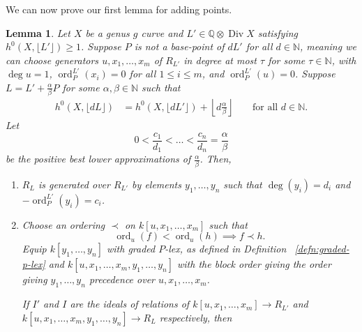 \documentclass{amsart}
\theoremstyle{plain}
\newtheorem{lem}[thm]{Lemma}
\theoremstyle{definition}
\theoremstyle{remark}
\numberwithin{equation}{section}
\newcommand\BN{{\mathbb N}}
\newcommand\BQ{{\mathbb Q}}
\DeclareMathOperator{\ord}{ord}
\DeclareMathOperator\di{Div}
\newcommand{\halfcan}{L}
\begin{document}
We can now prove our first lemma for adding points.

\begin{lem}
\label{lem:sat-1}
Let $X$ be a genus $g$ curve and $\halfcan' \in \BQ \otimes \di X$
satisfying $h^0(X, \lfloor{\halfcan'}\rfloor)\ge 1$. Suppose $P$ is not a base-point of $d\halfcan'$ for all $d \in \BN$, meaning we can choose generators $u, x_1, \ldots, x_m$ of $R_{\halfcan'}$ in degree at most $\tau$ for some $\tau\in \BN$, with $\deg u = 1$, $\ord_P^{\halfcan'}(x_i)=0$ for all $1 \leq i \leq m$, and $\ord_P^{\halfcan'}(u) = 0$.  Suppose $\halfcan = \halfcan' + \frac{\alpha}{\beta} P$
for some $\alpha, \beta \in \BN$ such that
\begin{align}
\label{eqn:deg1-sat-ind}
	h^0(X, \lfloor{d\halfcan}\rfloor) &= h^0(X, \lfloor d\halfcan'
	\rfloor) + \left\lfloor d\frac{\alpha} {\beta} \right \rfloor &&\text{ for all } d \in \mathbb{
	N}.
\end{align}
Let
\[
	0 < \frac{c_1}{d_1} < \ldots < \frac{c_n}{d_n} = \frac{\alpha}{\beta}
\]
be the positive best lower approximations of $\frac{\alpha}{\beta}$.
Then,

\begin{enumerate}
\item[(a)] $R_{\halfcan}$ is generated over $R_{\halfcan'}$ by 
	elements $y_1, \ldots, y_n$ such that $\deg(y_i) = d_i$ and $-\ord_P
	^{L'}(y_i) = c_i$.

\item[(b)] Choose an ordering $\prec$ on $k[u, x_1, \ldots, x_m]$ such that
	\[
		\ord_u(f) < \ord_u(h) \implies f\prec h.
	\]
	Equip $k[y_1, \ldots, y_n]$ with graded $P$-lex, as defined in
	Definition ~\ref{defn:graded-p-lex} and $k[u, x_1, \ldots, x_m, y_1,
	\ldots, y_n]$ with the block order giving the order giving $y_1, 
	\ldots, y_n$ precedence over $u, x_1, \ldots, x_m$.

	If $I'$ and $I$ are the ideals of relations of $k[u, x_1, \ldots, x_m]
	\to R_{\halfcan'}$ and $k[u, x_1, \ldots, x_m, y_1, \ldots, y_n]
	\to R_{\halfcan}$ respectively, then


\end{enumerate}
\end{lem}
\end{document}
